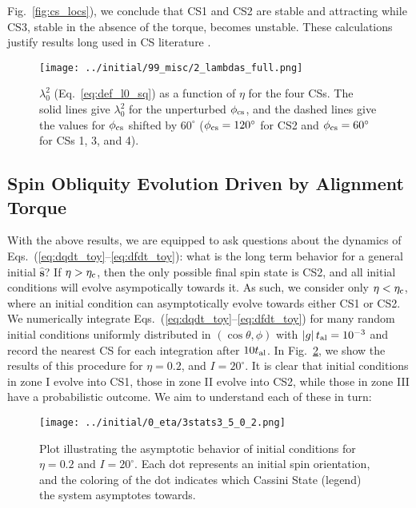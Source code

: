 \documentclass[
        fleqn,
        usenatbib,
    ]{mnras}
\newcommand*{\abs}[1]{\left|#1\right|}
\newcommand*{\p}[1]{\left(#1\right)}
\newcommand*{\uv}[1]{\hat{\mathbf{#1}}}
\begin{document}
Fig.~\ref{fig:cs_locs}), we conclude that CS1 and CS2 are stable and attracting
while CS3, stable in the absence of the torque, becomes unstable. These
calculations justify results long used in CS literature
\citep[e.g.][]{ward1975tidal, fabrycky_otides}.
\begin{figure}
    \centering
    \texttt{[image: ../initial/99\_misc/2\_lambdas\_full.png]}
    \caption{$\lambda_0^2$ (Eq.~\ref{eq:def_l0_sq}) as a function of $\eta$ for
    the four CSs. The solid lines give $\lambda_0^2$ for the unperturbed
    $\phi_{\rm cs}$, and the dashed lines give the values for $\phi_{\rm cs}$
    shifted by $60^\circ$ ($\phi_{\rm cs} = 120^\circ$ for CS2 and $\phi_{\rm
    cs} = 60^\circ$ for CSs 1, 3, and 4).
    }\label{fig:lambda_full}
\end{figure}

\subsection{Spin Obliquity Evolution Driven by Alignment
Torque}\label{ss:toy_outcomes}

With the above results, we are equipped to ask questions about the dynamics of
Eqs.~(\ref{eq:dqdt_toy}--\ref{eq:dfdt_toy}): what is the long term behavior for
a general initial $\uv{s}$? If $\eta > \eta_{\rm c}$, then the only possible
final spin state is CS2, and all initial conditions will evolve asympotically
towards it. As such, we consider only $\eta < \eta_{\rm c}$, where an initial
condition can asymptotically evolve towards either CS1 or CS2. We numerically
integrate Eqs.~(\ref{eq:dqdt_toy}--\ref{eq:dfdt_toy}) for many random initial
conditions uniformly distributed in $\p{\cos \theta, \phi}$ with $\abs{g}t_{\rm
al}= 10^{-3}$ and record the nearest CS for each integration after $10t_{\rm al}$. In Fig.~\ref{fig:toy_phop}, we show the results of this procedure for $\eta
= 0.2$, and $I = 20^\circ$. It is clear that initial conditions in zone I evolve
into CS1, those in zone II evolve into CS2, while those in zone III have a
probabilistic outcome. We aim to understand each of these in turn:
\begin{figure}
    \centering
    \texttt{[image: ../initial/0\_eta/3stats3\_5\_0\_2.png]}
    \caption{Plot illustrating the asymptotic behavior of initial conditions for
    $\eta = 0.2$ and $I = 20^\circ$. Each dot represents an initial spin
    orientation, and the coloring of the dot indicates which Cassini State
    (legend) the system asymptotes towards.}\label{fig:toy_phop}
\end{figure}
\end{document}

